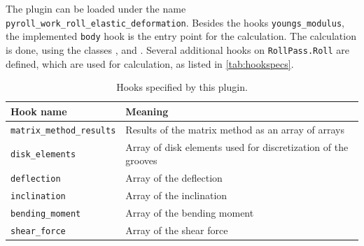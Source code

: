 \documentclass[11pt]{PyRollDocs}
\begin{document}
    The plugin can be loaded under the name \texttt{pyroll\_work\_roll\_elastic\_deformation}.
    Besides the hooks \lstinline{youngs_modulus}, the implemented \lstinline{body} hook is the entry point for the calculation.
    The calculation is done, using the classes ,  and .
    Several additional hooks on \lstinline{RollPass.Roll} are defined, which are used for calculation, as listed in \autoref{tab:hookspecs}.

    \begin{table}
        \centering
        \caption{Hooks specified by this plugin.}
        \label{tab:hookspecs}
        \begin{tabular}{ll}
            \toprule
            Hook name                        & Meaning                                                       \\
            \midrule
            \texttt{matrix\_method\_results} & Results of the matrix method as an array of arrays            \\
            \texttt{disk\_elements}          & Array of disk elements used for discretization of the grooves \\
            \texttt{deflection}              & Array of the deflection                                       \\
            \texttt{inclination}             & Array of the inclination                                      \\
            \texttt{bending\_moment}         & Array of the bending moment                                   \\
            \texttt{shear\_force}            & Array of the shear force                                      \\


            \bottomrule
        \end{tabular}
    \end{table}

    \printbibliography
\end{document}
